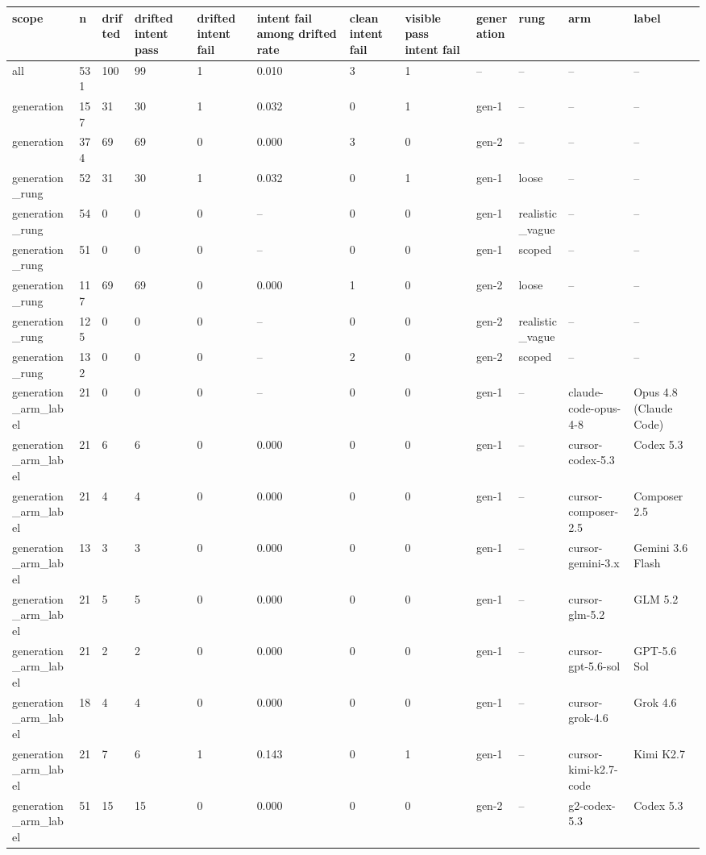 \begin{tabular}{llllllllllll}
\toprule
scope & n & drifted & drifted intent pass & drifted intent fail & intent fail among drifted rate & clean intent fail & visible pass intent fail & generation & rung & arm & label \\
\midrule
all & 531 & 100 & 99 & 1 & 0.010 & 3 & 1 & -- & -- & -- & -- \\
generation & 157 & 31 & 30 & 1 & 0.032 & 0 & 1 & gen-1 & -- & -- & -- \\
generation & 374 & 69 & 69 & 0 & 0.000 & 3 & 0 & gen-2 & -- & -- & -- \\
generation\_rung & 52 & 31 & 30 & 1 & 0.032 & 0 & 1 & gen-1 & loose & -- & -- \\
generation\_rung & 54 & 0 & 0 & 0 & -- & 0 & 0 & gen-1 & realistic\_vague & -- & -- \\
generation\_rung & 51 & 0 & 0 & 0 & -- & 0 & 0 & gen-1 & scoped & -- & -- \\
generation\_rung & 117 & 69 & 69 & 0 & 0.000 & 1 & 0 & gen-2 & loose & -- & -- \\
generation\_rung & 125 & 0 & 0 & 0 & -- & 0 & 0 & gen-2 & realistic\_vague & -- & -- \\
generation\_rung & 132 & 0 & 0 & 0 & -- & 2 & 0 & gen-2 & scoped & -- & -- \\
generation\_arm\_label & 21 & 0 & 0 & 0 & -- & 0 & 0 & gen-1 & -- & claude-code-opus-4-8 & Opus 4.8 (Claude Code) \\
generation\_arm\_label & 21 & 6 & 6 & 0 & 0.000 & 0 & 0 & gen-1 & -- & cursor-codex-5.3 & Codex 5.3 \\
generation\_arm\_label & 21 & 4 & 4 & 0 & 0.000 & 0 & 0 & gen-1 & -- & cursor-composer-2.5 & Composer 2.5 \\
generation\_arm\_label & 13 & 3 & 3 & 0 & 0.000 & 0 & 0 & gen-1 & -- & cursor-gemini-3.x & Gemini 3.6 Flash \\
generation\_arm\_label & 21 & 5 & 5 & 0 & 0.000 & 0 & 0 & gen-1 & -- & cursor-glm-5.2 & GLM 5.2 \\
generation\_arm\_label & 21 & 2 & 2 & 0 & 0.000 & 0 & 0 & gen-1 & -- & cursor-gpt-5.6-sol & GPT-5.6 Sol \\
generation\_arm\_label & 18 & 4 & 4 & 0 & 0.000 & 0 & 0 & gen-1 & -- & cursor-grok-4.6 & Grok 4.6 \\
generation\_arm\_label & 21 & 7 & 6 & 1 & 0.143 & 0 & 1 & gen-1 & -- & cursor-kimi-k2.7-code & Kimi K2.7 \\
generation\_arm\_label & 51 & 15 & 15 & 0 & 0.000 & 0 & 0 & gen-2 & -- & g2-codex-5.3 & Codex 5.3 \\

\end{tabular}
